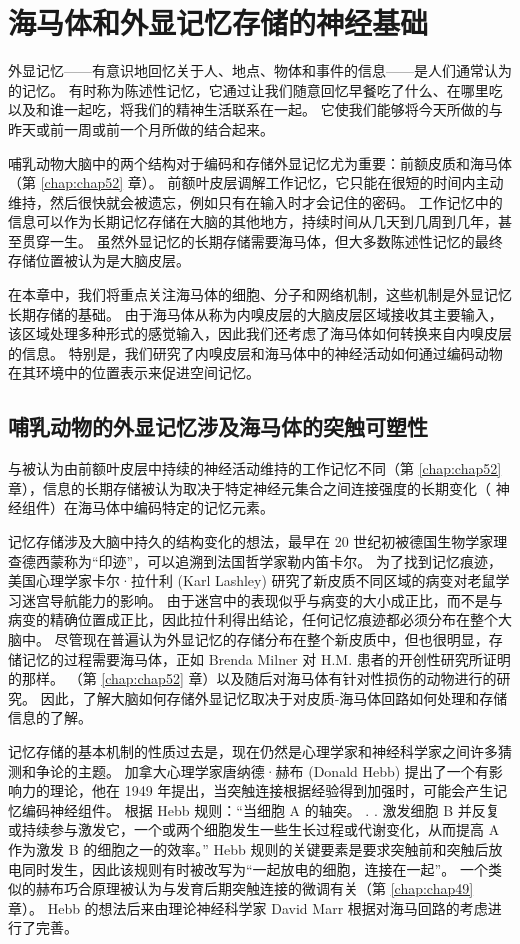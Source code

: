 \chapter{海马体和外显记忆存储的神经基础} \label{chap:chap54}

外显记忆——有意识地回忆关于人、地点、物体和事件的信息——是人们通常认为的记忆。 有时称为陈述性记忆，它通过让我们随意回忆早餐吃了什么、在哪里吃以及和谁一起吃，将我们的精神生活联系在一起。 它使我们能够将今天所做的与昨天或前一周或前一个月所做的结合起来。

哺乳动物大脑中的两个结构对于编码和存储外显记忆尤为重要：前额皮质和海马体（第 \ref{chap:chap52} 章）。 前额叶皮层调解工作记忆，它只能在很短的时间内主动维持，然后很快就会被遗忘，例如只有在输入时才会记住的密码。 工作记忆中的信息可以作为长期记忆存储在大脑的其他地方，持续时间从几天到几周到几年，甚至贯穿一生。 虽然外显记忆的长期存储需要海马体，但大多数陈述性记忆的最终存储位置被认为是大脑皮层。

在本章中，我们将重点关注海马体的细胞、分子和网络机制，这些机制是外显记忆长期存储的基础。 由于海马体从称为内嗅皮层的大脑皮层区域接收其主要输入，该区域处理多种形式的感觉输入，因此我们还考虑了海马体如何转换来自内嗅皮层的信息。 特别是，我们研究了内嗅皮层和海马体中的神经活动如何通过编码动物在其环境中的位置表示来促进空间记忆。


\section{哺乳动物的外显记忆涉及海马体的突触可塑性}
与被认为由前额叶皮层中持续的神经活动维持的工作记忆不同（第 \ref{chap:chap52} 章），信息的长期存储被认为取决于特定神经元集合之间连接强度的长期变化（ 神经组件）在海马体中编码特定的记忆元素。

记忆存储涉及大脑中持久的结构变化的想法，最早在 20 世纪初被德国生物学家理查德西蒙称为“印迹”，可以追溯到法国哲学家勒内笛卡尔。 为了找到记忆痕迹，美国心理学家卡尔·拉什利 (Karl Lashley) 研究了新皮质不同区域的病变对老鼠学习迷宫导航能力的影响。 由于迷宫中的表现似乎与病变的大小成正比，而不是与病变的精确位置成正比，因此拉什利得出结论，任何记忆痕迹都必须分布在整个大脑中。 尽管现在普遍认为外显记忆的存储分布在整个新皮质中，但也很明显，存储记忆的过程需要海马体，正如 Brenda Milner 对 H.M. 患者的开创性研究所证明的那样。 （第 \ref{chap:chap52} 章）以及随后对海马体有针对性损伤的动物进行的研究。 因此，了解大脑如何存储外显记忆取决于对皮质-海马体回路如何处理和存储信息的了解。

记忆存储的基本机制的性质过去是，现在仍然是心理学家和神经科学家之间许多猜测和争论的主题。 加拿大心理学家唐纳德·赫布 (Donald Hebb) 提出了一个有影响力的理论，他在 1949 年提出，当突触连接根据经验得到加强时，可能会产生记忆编码神经组件。 根据 Hebb 规则：“当细胞 A 的轴突。 . . 激发细胞 B 并反复或持续参与激发它，一个或两个细胞发生一些生长过程或代谢变化，从而提高 A 作为激发 B 的细胞之一的效率。” Hebb 规则的关键要素是要求突触前和突触后放电同时发生，因此该规则有时被改写为“一起放电的细胞，连接在一起”。 一个类似的赫布巧合原理被认为与发育后期突触连接的微调有关（第 \ref{chap:chap49} 章）。 Hebb 的想法后来由理论神经科学家 David Marr 根据对海马回路的考虑进行了完善。

